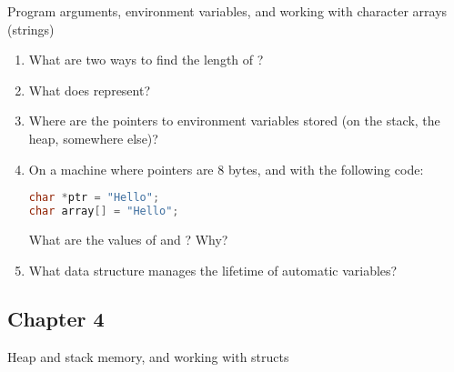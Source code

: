 Program arguments, environment variables, and working with character arrays (strings)

\begin{enumerate}
\item What are two ways to find the length of ?
\item What does  represent?
\item Where are the pointers to environment variables stored (on the stack, the heap, somewhere else)?
\item On a machine where pointers are 8 bytes, and with the following code:
\begin{lstlisting}[language=C]
char *ptr = "Hello";
char array[] = "Hello";
\end{lstlisting}
What are the values of  and ? Why?
\item What data structure manages the lifetime of automatic variables?
\end{enumerate}

\subsection{Chapter 4}

Heap and stack memory, and working with structs


